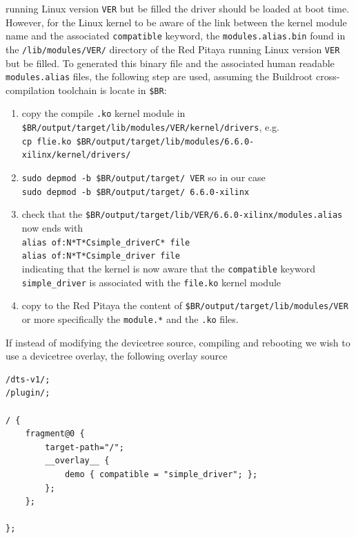\documentclass{article}
\begin{document}
{{{%
running Linux version {\tt VER} but be filled
\noindent the driver should be loaded at boot time. However, for the Linux kernel to be
aware of the link between the kernel module name and the associated {\tt compatible} keyword,
the {\tt modules.alias.bin} found in the {\tt /lib/modules/VER/} directory of the Red Pitaya
running Linux version {\tt VER} but be filled. To generated this binary file and the associated
human readable {\tt modules.alias} files, the following step are used, assuming the Buildroot
cross-compilation toolchain is locate in {\tt \$BR}:
\begin{enumerate}
\item copy the compile {\tt .ko} kernel module in {\tt \$BR/output/target/lib/modules/VER/kernel/drivers}, e.g. \\
{\tt cp flie.ko \$BR/output/target/lib/modules/6.6.0-xilinx/kernel/drivers/}
\item {\tt sudo depmod -b \$BR/output/target/ VER} so in our case\\
{\tt sudo depmod -b \$BR/output/target/ 6.6.0-xilinx}
\item check that the {\tt \$BR/output/target/lib/VER/6.6.0-xilinx/modules.alias} now ends with\\
{\tt alias of:N*T*Csimple\_driverC* file}\\
{\tt alias of:N*T*Csimple\_driver file}\\
indicating that the kernel is now aware that the {\tt compatible} keyword {\tt simple\_driver} is
associated with the {\tt file.ko} kernel module
\item copy to the Red Pitaya the content of {\tt \$BR/output/target/lib/modules/VER} or more
specifically the {\tt module.*} and the {\tt .ko} files.
\end{enumerate}

If instead of modifying the devicetree source, compiling and rebooting we wish to use a devicetree
overlay, the following overlay source

{\footnotesize
\begin{verbatim}
/dts-v1/;
/plugin/;
  
/ {
    fragment@0 {
        target-path="/";
        __overlay__ {
            demo { compatible = "simple_driver"; };
        };
    };
  
};
\end{verbatim}
}

}}}
\end{document}

